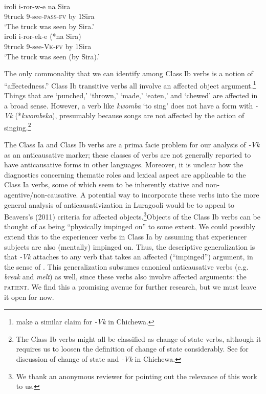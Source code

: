 \documentclass[output=paper]{langsci/langscibook}
\begin{document}
\ea\label{exx:}
\ea
{}\\
\gll iroli      i-ror-w-e         na Sira\\
     9truck  9-see-\textsc{pass-fv} by 1Sira\\
\glt ‘The truck was seen by Sira.’ 
\ex
{}\\
\gll iroli    i-ror-ek-e       (*na Sira)\\
     9truck 9-see-\textsc{Vk}\textsc{-}\textsc{fv}   by 1Sira\\
\glt ‘The truck was seen (by Sira).’
\z
\z

The only commonality that we can identify among Class Ib verbs is a notion of “affectedness.” Class Ib transitive verbs all involve an affected object argument.\footnote{ \citet{DubinskySimango1996} make a similar claim for \textit{-Vk} in Chichewa.} Things that are ‘punched,’ ‘thrown,’ ‘made,’ ‘eaten,’ and ‘chewed’ are affected in a broad sense. However, a verb like \textit{kwomba} ‘to sing’ does not have a form with \textit{-Vk} (*\textit{kwombeka}), presumably because songs are not affected by the action of singing.\footnote{ The Class Ib verbs might all be classified as change of state verbs, although it requires us to loosen the definition of change of state considerably. See \citet{DubinskySimango1996} for discussion of change of state and \textit{-Vk} in Chichewa.}

The Class Ia and Class Ib verbs are a prima facie problem for our analysis of \textit{-Vk} as an anticausative marker; these classes of verbs are not generally reported to have anticausative forms in other languages. Moreover, it is unclear how the diagnostics concerning thematic roles and lexical aspect are applicable to the Class Ia verbs, some of which seem to be inherently stative and non-agentive/non-causative. A potential way to incorporate these verbs into the more general analysis of anticausativization in Luragooli would be to appeal to Beavers’s (2011) criteria for affected objects.\footnote{ We thank an anonymous reviewer for pointing out the relevance of this work to us.}Objects\textsc{ }of the Class Ib verbs can be thought of as being “physically impinged on” to some extent. We could possibly extend this to the experiencer verbs in Class Ia by assuming that experiencer subjects are also (mentally) impinged on. Thus, the descriptive generalization is that  \textit{-Vk} attaches to any verb that takes an affected (“impinged”) argument, in the sense of \citet{Beavers2011}. This generalization subsumes canonical anticausative verbs (e.g. \textit{break} and \textit{melt}) as well, since these verbs also involve affected arguments: the \textsc{patient}. We find this a promising avenue for further research, but we must leave it open for now.
\end{document}
